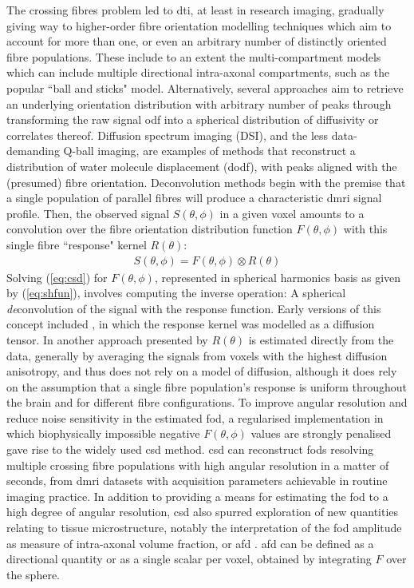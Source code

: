 The crossing fibres problem led to \gls{dti}, at least in research imaging, gradually giving way to higher-order fibre orientation modelling techniques which aim to account for more than one, or even an arbitrary number of distinctly oriented fibre populations\autocite{Alexander2005}.
These include to an extent the multi-compartment models which can include multiple directional intra-axonal compartments, such as the popular ``ball and sticks" model\autocite{Behrens2003,Behrens2007}.
Alternatively, several approaches aim to retrieve an underlying orientation distribution with arbitrary number of peaks through transforming the raw signal \gls{odf} into a spherical distribution of diffusivity or correlates thereof.
Diffusion spectrum imaging (DSI)\autocite{Wedeen2008}, and the less data-demanding Q-ball imaging\autocite{Tuch2003,Tuch2004}, are examples of methods that reconstruct a distribution of water molecule displacement (\gls{dodf}), with peaks aligned with the (presumed) fibre orientation.
Deconvolution methods begin with the premise that a single population of parallel fibres will produce a characteristic \gls{dmri} signal profile.
Then, the observed signal $S(\theta,\phi)$ in a given voxel amounts to a convolution over the fibre orientation distribution function $F(\theta,\phi)$ with this single fibre ``response" kernel $R(\theta)$:
\begin{align}
  S(\theta,\phi) = F(\theta,\phi) \otimes R(\theta)
\end{align}\label{eq:csd}
Solving (\ref{eq:csd}) for $F(\theta,\phi)$, represented in spherical harmonics basis as given by (\ref{eq:shfun}), involves computing the inverse operation: A spherical \textit{de}convolution of the signal with the response function.
Early versions of this concept included \textcite{Anderson2005}, in which the response kernel was modelled as a diffusion tensor.
In another approach presented by \textcite{Tournier2004} $R(\theta)$ is estimated directly from the data, generally by averaging the signals from voxels with the highest diffusion anisotropy, and thus does not rely on a model of diffusion, although it does rely on the assumption that a single fibre population's response is uniform throughout the brain and for different fibre configurations.
To improve angular resolution and reduce noise sensitivity in the estimated \gls{fod}, a regularised implementation in which biophysically impossible negative $F(\theta,\phi)$ values are strongly penalised gave rise to the widely used \gls{csd} method.
\Gls{csd} can reconstruct \glspl{fod} resolving multiple crossing fibre populations with high angular resolution in a matter of seconds, from \gls{dmri} datasets with acquisition parameters achievable in routine imaging practice\autocite{Tournier2013}.
In addition to providing a means for estimating the \gls{fod} to a high degree of angular resolution, \gls{csd} also spurred exploration of new quantities relating to tissue microstructure, notably the interpretation of the \gls{fod} amplitude as measure of intra-axonal volume fraction, or \gls{afd} \autocite{Raffelt2012a}.
\Gls{afd} can be defined as a directional quantity or as a single scalar per voxel, obtained by integrating $F$ over the sphere.

